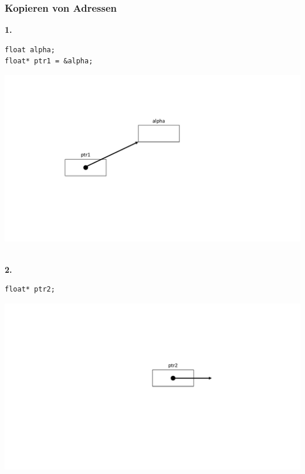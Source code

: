 \subsubsection{Kopieren von Adressen}
\Large{\textbf{1.}}\normalsize\\
\noindent
\begin{minipage}{0.3\linewidth}
\begin{lstlisting}
float alpha;
float* ptr1 = &alpha;
\end{lstlisting}
\end{minipage}
\hspace{0.01\linewidth}
\begin{minipage}{0.3\linewidth}
	\includegraphics[width=\linewidth]{images/pointer4.pdf}
\end{minipage}\\

\Large{\textbf{2.}}\normalsize\\
\noindent
\begin{minipage}{0.3\linewidth}
\begin{lstlisting}
float* ptr2;
\end{lstlisting}
\end{minipage}
\hspace{0.01\linewidth}
\begin{minipage}{0.2\linewidth}
	\centering
	\includegraphics[width=\linewidth]{images/pointer5.pdf}
\end{minipage}\\

